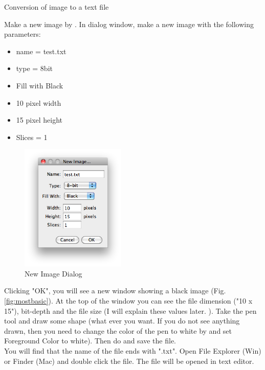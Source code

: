 \begin{indentexercise}{1}
\label{exer:1111}
\item Conversion of image to a text file
\item Make a new image by . In dialog window,
make a new image with the following parameters:

\begin{itemize}
\item name = test.txt
\item type = 8bit
\item Fill with Black
\item 10 pixel width
\item 15 pixel height
\item Slices = 1
\end{itemize}


\begin{figure}[htbp]
\begin{center}
\includegraphics[width=5cm]{fig/CMCIBasicCourse201102-img1.png}
\caption{ New Image Dialog}
\label{fig:img1}
\end{center}
\end{figure}
Clicking "OK", you will see a new window showing a black image (Fig.
\ref{fig:mostbasic}). At the top of the window you can see the file dimension ("10 x 15"), 
bit-depth and the file size (I will explain these values later.
). Take the pen tool and draw some shape (what ever you want. 
If you do not see anything drawn, then you need to change the color of the pen to white by 
 and set Foreground Color to white). 
Then do  and save the file. \\

You will find that the name of the file ends with ".txt". 
Open File Explorer (Win) or Finder (Mac) and double click the file. 
The file will be opened in text editor.


\end{indentexercise}
